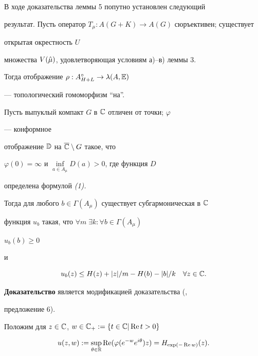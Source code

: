  


\begin{note} В ходе доказательства леммы 5 попутно установлен следующий 


результат. Пусть оператор $T_\mu :A(G+K)\to A(G)$ сюръективен; существует 


открытая окрестность $U$ 


множества $V(\Hat\mu)$, удовлетворяющая условиям а)--в) леммы 3. 


Тогда отображение $\rho :A^\circ_{H+L}\to\lambda(A,\Bbb E)$


--- топологический гомоморфизм ``на''. 


\end{note} 


 


\begin{lem} Пусть выпуклый компакт $G$ в $\Bbb C$ отличен от точки; $\varphi$ 


--- конформное 


отображение $\Bbb D$ на $\overline{\Bbb C}\setminus G$ такое, что 


$\varphi(0)=\infty$ и $\inf\limits_{a\in A_\mu}D(a)>0$, где функция $D$ 


определена формулой {\em (1).}


Тогда для любого $b\in\Gamma(A_\mu)$ существует субгармоническая в $\Bbb C$ 


функция $u_b$ такая, что $\forall m\;\exists k:\forall b\in\Gamma(A_\mu)$ 


$u_b(b)\ge 0$ 


и 


$$ 


u_b(z)\le H(z)+|z|/m-H(b)-|b|/k\quad \forall z\in\Bbb C. 


$$ 


\end{lem} 


 


{\bf Доказательство} является модификацией доказательства (\cite{Momm2},


предложение 6). 


Положим для $z\in\Bbb C$, $w\in\Bbb C_+:=\{t\in\Bbb C\vert\operatorname{Re} t>0\}$ 


$$ 


u(z,w):=\sup_{\theta\in\Bbb R}\R(\varphi(e^{-w}e^{i\theta})z)= 


H_{\exp(-\R w)}(z). 


$$ 


